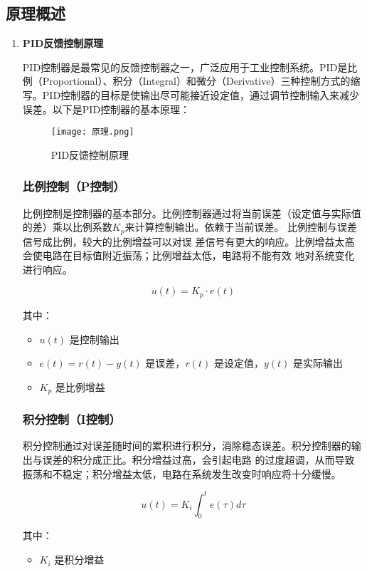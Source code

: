\documentclass[dvipsnames, svgnames,a4paper,11pt]{article}
\begin{document}
	\subsection{原理概述}
	\begin{enumerate}
	\item \textbf{PID反馈控制原理}
	
	PID控制器是最常见的反馈控制器之一，广泛应用于工业控制系统。PID是比例（Proportional）、积分（Integral）和微分（Derivative）三种控制方式的缩写。PID控制器的目标是使输出尽可能接近设定值，通过调节控制输入来减少误差。以下是PID控制器的基本原理：
	\begin{figure}[{H}]
		\centering
		\texttt{[image: 原理.png]}
		\caption{PID反馈控制原理}
		\label{}
	\end{figure}

\subsubsection*{ 比例控制（P控制）}
比例控制是控制器的基本部分。比例控制器通过将当前误差（设定值与实际值的差）乘以比例系数\(K_p\)来计算控制输出。依赖于当前误差。 比例控制与误差信号成比例，较大的比例增益可以对误
差信号有更大的响应。比例增益太高会使电路在目标值附近振荡；比例增益太低，电路将不能有效
地对系统变化进行响应。

\[
u(t) = K_p \cdot e(t)
\]

其中：
\begin{itemize}
    \item \(u(t)\) 是控制输出
    \item \(e(t) = r(t) - y(t)\) 是误差，\(r(t)\) 是设定值，\(y(t)\) 是实际输出
    \item \(K_p\) 是比例增益
\end{itemize}

\subsubsection*{积分控制（I控制）}

积分控制通过对误差随时间的累积进行积分，消除稳态误差。积分控制器的输出与误差的积分成正比。积分增益过高，会引起电路
的过度超调，从而导致振荡和不稳定；积分增益太低，电路在系统发生改变时响应将十分缓慢。

\[
u(t) = K_i \int_{0}^{t} e(\tau) d\tau
\]

其中：
\begin{itemize}
    \item \(K_i\) 是积分增益
\end{itemize}


\end{enumerate}
\end{document}
